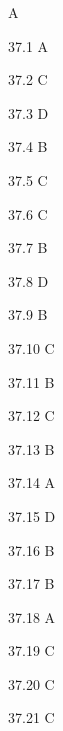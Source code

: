 \begin{Solution}{37}
A
\end{Solution}
\begin{Solution}{37.{1}}
A
\end{Solution}
\begin{Solution}{37.{2}}
C
\end{Solution}
\begin{Solution}{37.{3}}
D
\end{Solution}
\begin{Solution}{37.{4}}
B
\end{Solution}
\begin{Solution}{37.{5}}
C
\end{Solution}
\begin{Solution}{37.{6}}
C
\end{Solution}
\begin{Solution}{37.{7}}
B
\end{Solution}
\begin{Solution}{37.{8}}
D
\end{Solution}
\begin{Solution}{37.{9}}
B
\end{Solution}
\begin{Solution}{37.{10}}
C
\end{Solution}
\begin{Solution}{37.{11}}
B
\end{Solution}
\begin{Solution}{37.{12}}
C
\end{Solution}
\begin{Solution}{37.{13}}
B
\end{Solution}
\begin{Solution}{37.{14}}
A
\end{Solution}
\begin{Solution}{37.{15}}
D
\end{Solution}
\begin{Solution}{37.{16}}
B
\end{Solution}
\begin{Solution}{37.{17}}
B
\end{Solution}
\begin{Solution}{37.{18}}
A
\end{Solution}
\begin{Solution}{37.{19}}
C
\end{Solution}
\begin{Solution}{37.{20}}
C
\end{Solution}
\begin{Solution}{37.{21}}
C
\end{Solution}
